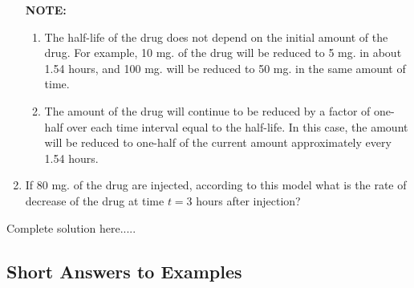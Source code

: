 \begin{example}
\begin{enumerate}[leftmargin=*]
\renewcommand{\labelenumii}{\textbf{(\arabic{enumii})}}
\textbf{NOTE:}  
\begin{enumerate}[leftmargin=*]
    \item The half-life of the drug does not depend on the initial amount of the drug.  For example, 10 mg. of the drug will be reduced to 5 mg. in about 1.54 hours, and 100 mg. will be reduced to 50 mg. in the same amount of time. 
    \item The amount of the drug will continue to be reduced by a factor of one-half over each time interval equal to the half-life.  In this case, the amount will be reduced to one-half of the current amount approximately every 1.54 hours.
\end{enumerate}
\item If 80 mg. of the drug are injected, according to this model what is the rate of decrease of the drug at time $t=3$ hours after injection? 
\end{enumerate}
    \begin{sol}
    \end{sol}
    \begin{solL}
    Complete solution here.....
    
    \end{solL}
    
\end{example}



\vspace*{\fill}

\subsection*{Short Answers to Examples}




